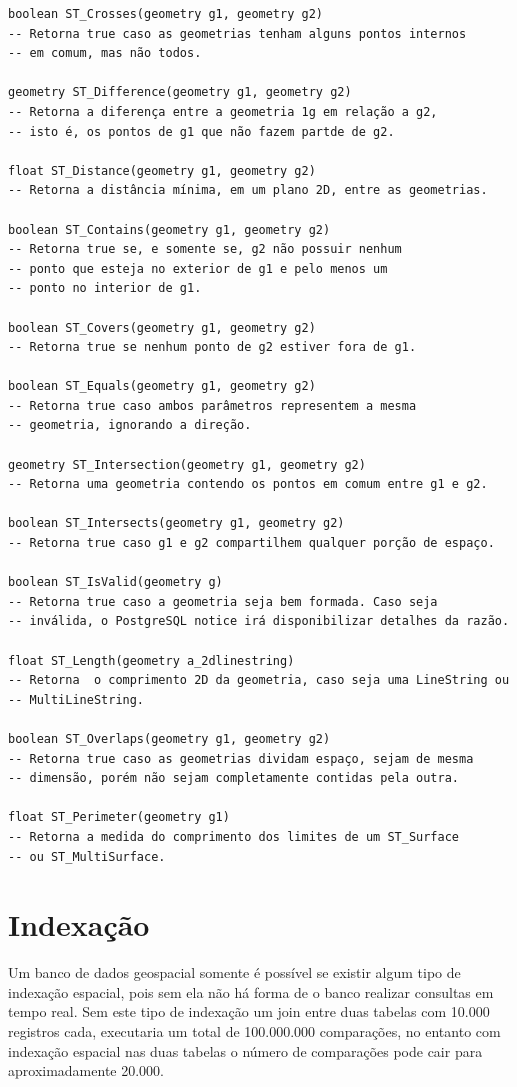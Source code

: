 \documentclass[12pt]{article}
\begin{document}
\begin{verbatim}
boolean ST_Crosses(geometry g1, geometry g2)
-- Retorna true caso as geometrias tenham alguns pontos internos
-- em comum, mas não todos.

geometry ST_Difference(geometry g1, geometry g2)
-- Retorna a diferença entre a geometria 1g em relação a g2,
-- isto é, os pontos de g1 que não fazem partde de g2.

float ST_Distance(geometry g1, geometry g2)
-- Retorna a distância mínima, em um plano 2D, entre as geometrias.

boolean ST_Contains(geometry g1, geometry g2)
-- Retorna true se, e somente se, g2 não possuir nenhum
-- ponto que esteja no exterior de g1 e pelo menos um
-- ponto no interior de g1.

boolean ST_Covers(geometry g1, geometry g2)
-- Retorna true se nenhum ponto de g2 estiver fora de g1.

boolean ST_Equals(geometry g1, geometry g2)
-- Retorna true caso ambos parâmetros representem a mesma
-- geometria, ignorando a direção.

geometry ST_Intersection(geometry g1, geometry g2)
-- Retorna uma geometria contendo os pontos em comum entre g1 e g2.

boolean ST_Intersects(geometry g1, geometry g2)
-- Retorna true caso g1 e g2 compartilhem qualquer porção de espaço.

boolean ST_IsValid(geometry g)
-- Retorna true caso a geometria seja bem formada. Caso seja
-- inválida, o PostgreSQL notice irá disponibilizar detalhes da razão.

float ST_Length(geometry a_2dlinestring)
-- Retorna  o comprimento 2D da geometria, caso seja uma LineString ou
-- MultiLineString.

boolean ST_Overlaps(geometry g1, geometry g2)
-- Retorna true caso as geometrias dividam espaço, sejam de mesma
-- dimensão, porém não sejam completamente contidas pela outra.

float ST_Perimeter(geometry g1)
-- Retorna a medida do comprimento dos limites de um ST_Surface
-- ou ST_MultiSurface.
\end{verbatim}

\section{Indexação}
Um banco de dados geospacial somente é possível se existir algum tipo de indexação
espacial, pois sem ela não há forma de o banco realizar consultas em tempo real.
Sem este tipo de indexação um join entre duas tabelas com 10.000 registros cada,
executaria um total de 100.000.000 comparações, no entanto com indexação espacial
nas duas tabelas o número de comparações pode cair para aproximadamente 20.000.
\end{document}

